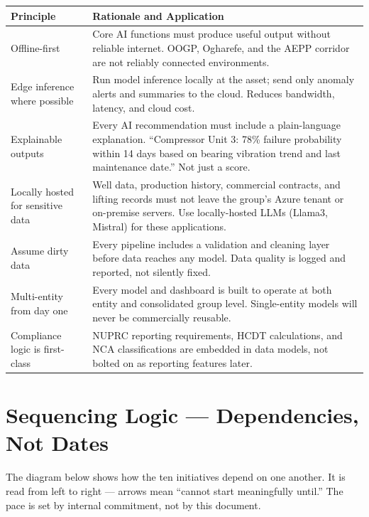 \documentclass[10pt]{article}
\newcommand{\bigspacer}{\vspace{16pt}}
\begin{document}
\small
\begin{tabularx}{\columnwidth}{@{}lX@{}}
\toprule
\textbf{Principle} & \textbf{Rationale and Application} \\
\midrule
Offline-first
  & Core AI functions must produce useful output without reliable internet.
    OOGP, Ogharefe, and the AEPP corridor are not reliably connected
    environments. \\
Edge inference where possible
  & Run model inference locally at the asset; send only anomaly alerts and
    summaries to the cloud. Reduces bandwidth, latency, and cloud cost. \\
Explainable outputs
  & Every AI recommendation must include a plain-language explanation.
    ``Compressor Unit 3: 78\% failure probability within 14 days based on
    bearing vibration trend and last maintenance date.'' Not just a score. \\
Locally hosted for sensitive data
  & Well data, production history, commercial contracts, and lifting records
    must not leave the group's Azure tenant or on-premise servers. Use
    locally-hosted LLMs (Llama3, Mistral) for these applications. \\
Assume dirty data
  & Every pipeline includes a validation and cleaning layer before data
    reaches any model. Data quality is logged and reported, not silently
    fixed. \\
Multi-entity from day one
  & Every model and dashboard is built to operate at both entity and
    consolidated group level. Single-entity models will never be commercially
    reusable. \\
Compliance logic is first-class
  & NUPRC reporting requirements, HCDT calculations, and NCA classifications
    are embedded in data models, not bolted on as reporting features later. \\
\bottomrule
\end{tabularx}
\normalsize

\bigspacer

\section{Sequencing Logic --- Dependencies, Not Dates}

The diagram below shows how the ten initiatives depend on one another. It
is read from left to right --- arrows mean ``cannot start meaningfully until.''
The pace is set by internal commitment, not by this document.
\end{document}
